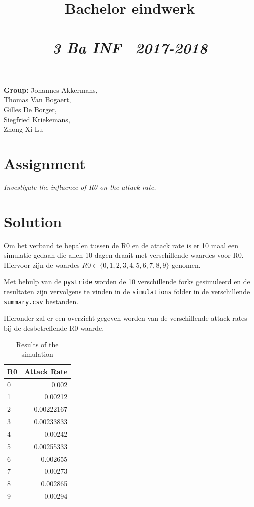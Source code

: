 \documentclass{article}
\title{\textmd{\textbf{Bachelor eindwerk}}\\\normalsize\vspace{0.1in}\Large{\projectnaam}\\\vspace{0.1in}\small{\textit{3 Ba INF \  2017-2018}}}
\author{}
\newcommand{\team}{
	\=Johannes Akkermans, \\\>Thomas Van Bogaert, \\\>Gilles De Borger, \\\>Siegfried Kriekemans, \\\>Zhong Xi Lu
}
\begin{document}
\maketitle

\begin{center}
	\parbox{0cm}{
		\begin{tabbing}
		\textbf{Group:} \team
		\end{tabbing}
	}
\end{center}

\newpage
\section{Assignment}
\begin{center}
	\textit{Investigate the influence of R0 on the attack rate.}
\end{center}

\section{Solution}
Om het verband te bepalen tussen de R0 en de attack rate is er 10 maal een simulatie gedaan die allen 10 dagen draait met verschillende waardes voor R0. Hiervoor zijn de waardes $R0 \in \{0,1,2,3,4,5,6,7,8,9\}$ genomen.

Met behulp van de \texttt{pystride} worden de 10 verschillende forks gesimuleerd en de resultaten zijn vervolgens te vinden in de \texttt{simulations} folder in de verschillende \texttt{summary.csv} bestanden. 

Hieronder zal er een overzicht gegeven worden van de verschillende attack rates bij de desbetreffende R0-waarde.

\begin{table}[h]
	\centering
	\begin{tabular}{ | l | r | }
		\hline			
		\textbf{R0} & \textbf{Attack Rate}  \\ \hline
		0 & 0.002  \\
		1 & 0.00212  \\
		2 & 0.00222167  \\
		3 & 0.00233833  \\
		4 & 0.00242  \\
		5 & 0.00255333  \\
		6 & 0.002655  \\
		7 & 0.00273  \\
		8 & 0.002865  \\
		9 & 0.00294  \\
		\hline  
	\end{tabular}
	\caption{Results of the simulation}
\end{table}
\end{document}
